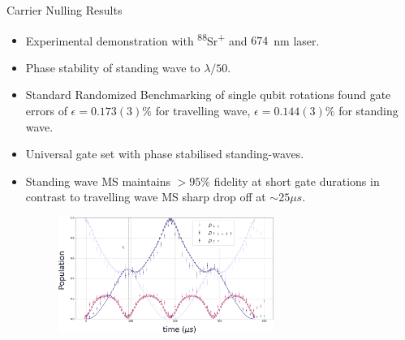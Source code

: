 \documentclass[final]{beamer}
\begin{document}
\begin{frame}{}
\begin{center}
\begin{columns}[t]
\begin{column}{0.49\textwidth}
  \end{column}
  \begin{column}{0.49\textwidth}
    \begin{alertblock}{Carrier Nulling Results}
      \begin{minipage}{0.6\linewidth}
      \begin{itemize}
        \item Experimental demonstration with \textsuperscript{88}Sr\textsuperscript{+} and $674$~nm laser.
        \item Phase stability of standing wave to $\lambda/50$.
        \item Standard Randomized Benchmarking of single qubit
          rotations found gate errors of $\epsilon = 0.173(3)\%$ for
          travelling wave, $\epsilon = 0.144(3)\%$ for standing
          wave.
        \item Universal gate set with phase stabilised standing-waves.
        \item Standing wave MS maintains $>95\%$ fidelity at short gate durations in contrast to travelling wave MS sharp drop off at $\sim 25\mu s$.\\
      \begin{figure}
        \includegraphics[width=0.7\textwidth]{./figs/temp_gate_profile.png}
      \end{figure}
      \end{itemize}
      \end{minipage}
      ~~~~
      \begin{minipage}{0.34\linewidth}
      \begin{figure}
        \fbox{
}
\end{figure}
\end{minipage}
\end{alertblock}
\end{column}
\end{columns}
\end{center}
\end{frame}
\end{document}
